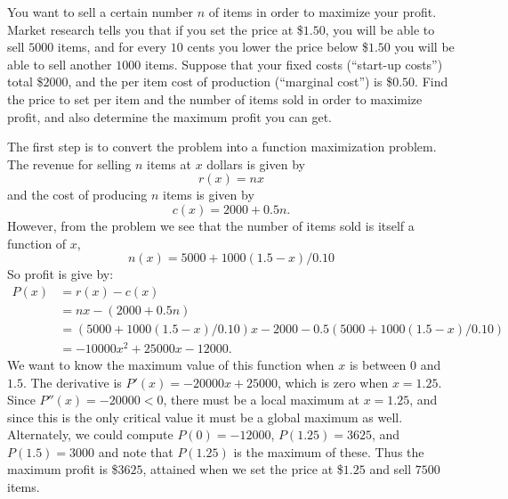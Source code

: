 \begin{example}
    You want to sell a certain number $n$ of items in order to maximize your
    profit.  Market research tells you that if you set the price at \$$1.50$, you
    will be able to sell $5000$ items, and for every $10$ cents you lower the price
    below \$$1.50$ you will be able to sell another $1000$ items.  Suppose that
    your fixed costs (``start-up costs'') total \$$2000$, and the per item cost
    of production (``marginal cost'') is \$$0.50$.  Find the price to set per
    item and the number of items sold in order to maximize profit, and also
    determine the maximum profit you can get. \cite{mooc}\\
    
    \begin{solution}
    The first step is to convert the problem into a function maximization
    problem. The revenue for selling $n$ items at $x$ dollars is given by
    \[
    r(x) = nx
    \]
    and the cost of producing $n$ items is given by
    \[
    c(x) = 2000+0.5 n. 
    \]
    However, from the problem we see that the number of items sold is
    itself a function of $x$,
    \[
    n(x) =5000+1000(1.5-x)/0.10
    \]
    So profit is give by:
    \begin{align*}
    P(x) &= r(x) - c(x)\\
    &= nx - (2000+0.5 n)\\
    &= (5000+1000(1.5-x)/0.10)x - 2000 - 0.5 (5000+1000(1.5-x)/0.10)\\
    &=-10000x^2+25000x-12000. 
    \end{align*}
    We want to know the maximum value of this function when $x$ is between
    0 and $1.5$. The derivative is $P'(x)=-20000x+25000$, which is zero
    when $x=1.25$. Since $P''(x)=-20000<0$, there must be a local maximum
    at $x=1.25$, and since this is the only critical value it must be a
    global maximum as well. Alternately, we could compute $P(0)=-12000$,
    $P(1.25)=3625$, and $P(1.5)=3000$ and note that $P(1.25)$ is the
    maximum of these. Thus the maximum profit is \$$3625$, attained when we
    set the price at \$$1.25$ and sell $7500$ items. 
    \end{solution}
\end{example}

